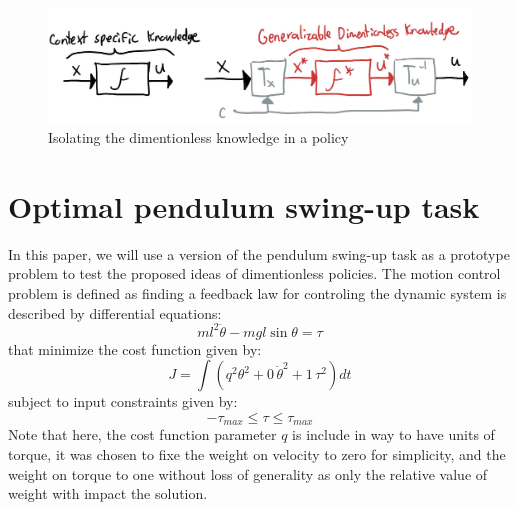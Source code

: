 \begin{figure}[t]
\vspace{-5pt}
\begin{center}
\includegraphics[width=0.99\linewidth]{fig/dimpol.jpg}
\caption{Isolating the dimentionless knowledge in a policy}\label{fig:dimpol}
\end{center}
\vspace{-15pt}
\end{figure}



 









\section{Optimal pendulum swing-up task}
\label{sec:optimalswingup}
In this paper, we will use a version of the pendulum swing-up task as a prototype problem to test the proposed ideas of dimentionless policies. The motion control problem is defined as finding a feedback law for controling the dynamic system is described by differential equations:
\begin{equation}
ml^2 \ddot{\theta} - mgl \sin \theta = \tau
\label{eq:pendulum_dynamics}
\end{equation}
that minimize the cost function given by:
\begin{equation}
J = \int{( q^2 \theta^2 + 0 \, \dot{\theta}^2 + 1 \, \tau^2 ) dt }
\label{eq:pendulum_cost}
\end{equation}
subject to input constraints given by:
\begin{equation}
- \tau_{max} \leq \tau \leq \tau_{max}
\label{eq:pendulum_constraints}
\end{equation}
Note that here, the cost function parameter $q$ is include in way to have units of torque, it was chosen to fixe the weight on velocity to zero for simplicity, and the weight on torque to one without loss of generality as only the relative value of weight with impact the solution. 

